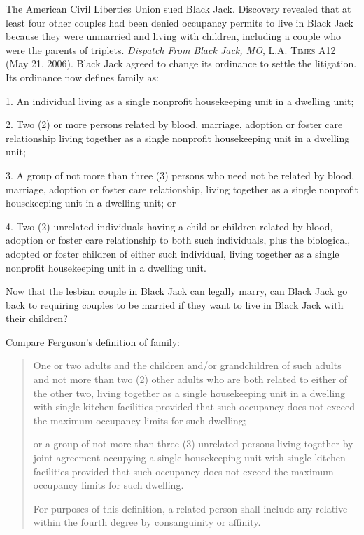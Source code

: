 The American Civil Liberties Union sued Black Jack. Discovery revealed that at
least four other couples had been denied occupancy permits to live in Black Jack
because they were unmarried and living with children, including a couple who
were the parents of triplets. \textit{Dispatch From Black Jack, MO},
\textsc{L.A. Times} A12 (May 21, 2006). Black Jack agreed to change its
ordinance to settle the litigation. Its ordinance now defines family as:
\begin{statute}
\item 1. An individual living as a single nonprofit housekeeping unit in a
dwelling unit; 

\item 2. Two (2) or more persons related by blood, marriage, adoption or foster
care relationship living together as a single nonprofit housekeeping unit in a
dwelling unit; 

\item 3. A group of not more than three (3) persons who need not be related by
blood, marriage, adoption or foster care relationship, living together as a
single nonprofit housekeeping unit in a dwelling unit; or 

\item 4. Two (2) unrelated individuals having a child or children related by
blood, adoption or foster care relationship to both such individuals, plus the
biological, adopted or foster children of either such individual, living
together as a single nonprofit housekeeping unit in a dwelling unit. 
\end{statute}
Now that the lesbian couple in Black Jack can legally marry, can Black Jack go
back to requiring couples to be married if they want to live in Black Jack with
their children?

\item
Compare Ferguson's definition of family:
\begin{quotation}
One or two adults and the children and/or grandchildren of such adults and not
more than two (2) other adults who are both related to either of the other two,
living together as a single housekeeping unit in a dwelling with single kitchen
facilities provided that such occupancy does not exceed the maximum occupancy
limits for such dwelling; 

or a group of not more than three (3) unrelated persons living together by joint
agreement occupying a single housekeeping unit with single kitchen facilities
provided that such occupancy does not exceed the maximum occupancy limits for
such dwelling. 

For purposes of this definition, a related person shall include any relative
within the fourth degree by consanguinity or affinity.
\end{quotation}

